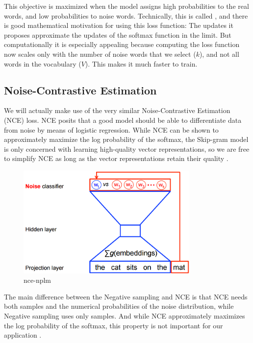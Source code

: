  This objective is maximized when the model assigns high probabilities to the real words, and low probabilities to noise words. Technically, this is called \textcite{ Negative Sampling}, and there is good mathematical motivation for using this loss function: The updates it proposes approximate the updates of the softmax function in the limit. But computationally it is especially appealing because computing the loss function now scales only with the number of noise words that we select ($k$), and not all words in the vocabulary ($V$). This makes it much faster to train.
 
\subsection{Noise-Contrastive Estimation}

We will actually make use of the very similar Noise-Contrastive Estimation (NCE) loss. NCE posits that a good model should be able to differentiate data from noise by means of logistic regression. While NCE can be shown to approximately maximize the log probability of the softmax, the Skip-gram model is only concerned with learning high-quality vector representations, so we are free to simplify NCE as long as the vector representations retain their quality \cite{DBLP:journals/corr/MikolovSCCD13}.

\begin{figure}[H]%
    \center%
    \includegraphics[width=0.8\textwidth]{images/nce-nplm.png}%
    \caption[nce]{nce-nplm}\label{fig:nce-nplm}%
\end{figure}

The main difference between the Negative sampling and NCE is that NCE needs both
samples and the numerical probabilities of the noise distribution, while Negative sampling uses only samples. And while NCE approximately maximizes the log probability of the softmax, this property is not important for our application \cite{DBLP:journals/corr/MikolovSCCD13}.

